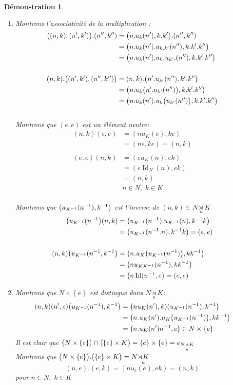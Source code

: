 \documentclass[a4paper, oneside]{report}
\theoremstyle{break}
\newtheorem*{demonstration}{Démonstration}
\DeclarePairedDelimiter\ens{\left\{ }{\right\} }%
\DeclarePairedDelimiter\pa{\big(}{\big)}%
\DeclareMathOperator{\Id}{Id}
\renewcommand{\ens}[1]{\left\{ #1 \right\} }%
\newcommand{\us}{\underset}
\newcommand{\Pa}{\pa}
\newcommand{\para}{\pa}
\begin{document}
\begin{demonstration}
\begin{enumerate}
\item  Montrons l'associativité de la multiplication :
\begin{align*}
\pa{(n, k), (n', k')} . (n'', k'') &= \pa{n . u_k (n'), k.k'}.(n'', k'')
\\
&= \pa{n . u_k(n') . u_{k.k'}(n''), k.k'.k''}
\\
&= \pa{n . u_k(n') . u_k . u_{k'} . (n''), k.k'.k''}
\\
\\
(n, k) . \pa{(n', k'), (n'', k'')} &= (n, k) . \pa{n' . u_{k'}(n''), k'.k''}
\\
&= \Pa{n . u_k\pa{n'.u_{k'}(n'')}, k.k'.k''}
\\
&= \Pa{n . u_k(n').u_k\pa{u_{k'}(n'')}, k.k'.k''}
\end{align*}\\
Montrons que $(e,e)$ est un élément neutre:
\begin{align*}
(n,k)(e,e) &= (n u_K(e), ke)
\\
&= (ne, ke) = (n,k)
\\
\\
(e,e)(n,k) &= (e u_K(n), ek) 
\\
&= (e \Id_N(n), ek) 
\\
&= (n,k)
\\
&n \in N, \; k \in K
\end{align*}\\
Montrons que $\pa{u_{K^{-1}}(n^{-1}), k^{-1}}$ est l'inverse de $(n,k) \in N \us{u}{\rtimes} K$
\begin{align*}
\pa{u_{K^{-1}}(n^{-1}}(n, k) &= \pa{u_{K^{-1}}(n^{-1}) . u_{K^{-1}}(n), k^{-1}k} 
\\
&= \pa{u_{K^{-1}}(n^{-1}.n), k^{-1}k} = (e, e)
\\
\\
(n,k)\pa{u_{K^{-1}}(n^{-1}, k^{-1}} &= \Pa{n . u_K \pa{u_{K^{-1}}(n^{-1})}, kk^{-1}} 
\\
&= \pa{n u_{KK^{-1}}(n^{-1}), kk^{-1}} 
\\
&= \pa{n \Id(n^{-1}, e} = (e, e)
\end{align*}

\bigbreak

\item  Montrons que $N \times \ens{e}$ est distingué dans $N \us{u}{\rtimes} K$:
\begin{align*}
(n, k)(n', e)\pa{u_{K^{-1}}(n^{-1}), k ^{-1}} &= \pa{n u_K(n'), k)(u_{K^{-1}}(n^{-1}), k^{-1}}
\\
&= \Pa{n . u_K(n') . u_K\pa{u_{K^{-1}}(n^{-1})}, kk^{-1}}
\\
&= \pa{n . u_K(n')n^{-1}, e} \in N \times \ens{e}
\end{align*}
Il est clair que $\para{N \times \ens{e}} \cap \para{\ens{e} \times K} = \ens{e} \times \ens{e} = e_{N \us{u}{\rtimes} K}$\\
Montrons que $\para{N \times \ens{e}} . \para{\ens{e} \times K} = N \us{u}{\rtimes K}$
\[
(n, e).(e, k) = (n u_e(e), ek) = (n,k)
\]
pour $n \in N, \; k \in K$
\end{enumerate}
\end{demonstration}
\end{document}
